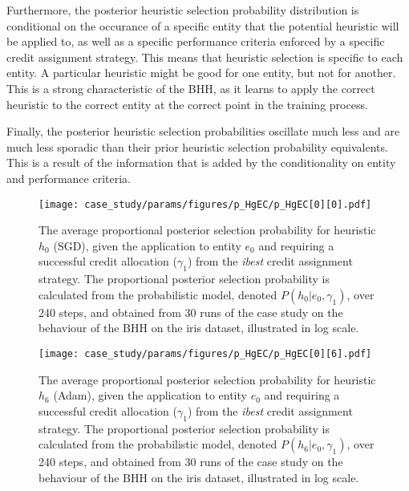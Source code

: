 Furthermore, the posterior heuristic selection probability distribution is conditional on the occurance of a specific entity that the potential heuristic will be applied to, as well as a specific performance criteria enforced by a specific credit assignment strategy. This means that heuristic selection is specific to each entity. A particular heuristic might be good for one entity, but not for another. This is a strong characteristic of the \acs{BHH}, as it learns to apply the correct heuristic to the correct entity at the correct point in the training process.

Finally, the posterior heuristic selection probabilities oscillate much less and are much less sporadic than their prior heuristic selection probability equivalents. This is a result of the information that is added by the conditionality on entity and performance criteria.

\begin{figure}[htpb]
	\centering
	\texttt{[image: case\_study/params/figures/p\_HgEC/p\_HgEC[0][0].pdf]}
	\caption{The average proportional posterior selection probability for heuristic $h_{0}$ (\acs{SGD}), given the application to entity $e_{0}$ and requiring a successful credit allocation ($\gamma_{1}$) from the \textit{ibest} credit assignment strategy. The proportional posterior selection probability is calculated from the probabilistic model, denoted $P(h_{0} \vert e_{0}, \gamma_{1})$, over 240 steps, and obtained from 30 runs of the case study on the behaviour of the \acs{BHH} on the iris dataset, illustrated in log scale.}
	\label{fig:results:case_study:p_HgEC:0:0}
\end{figure}

\begin{figure}[htpb]
	\centering
	\texttt{[image: case\_study/params/figures/p\_HgEC/p\_HgEC[0][6].pdf]}
	\caption{The average proportional posterior selection probability for heuristic $h_{6}$ (\acs{Adam}), given the application to entity $e_{0}$ and requiring a successful credit allocation ($\gamma_{1}$) from the \textit{ibest} credit assignment strategy. The proportional posterior selection probability is calculated from the probabilistic model, denoted $P(h_{6} \vert e_{0}, \gamma_{1})$, over 240 steps, and obtained from 30 runs of the case study on the behaviour of the \acs{BHH} on the iris dataset, illustrated in log scale.}
	\label{fig:results:case_study:p_HgEC:0:6}
\end{figure}

